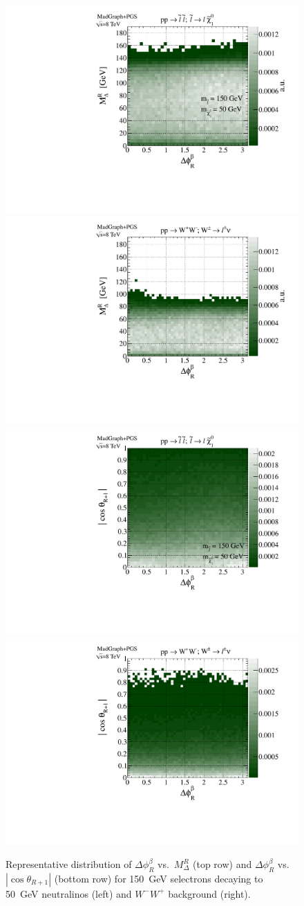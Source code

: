 \begin{figure}[ht]
\includegraphics[width=0.35\columnwidth]{fig/sectionII/Mdelta_v_dphi_slepton_150_50.pdf}\includegraphics[width=0.35\columnwidth]{fig/sectionII/Mdelta_v_dphi_WW.pdf}
\includegraphics[width=0.35\columnwidth]{fig/sectionII/costheta_v_dphi_selectron_150_50.pdf}\includegraphics[width=0.35\columnwidth]{fig/sectionII/costheta_v_dphi_WW.pdf}
\caption{Representative distribution of $\Delta\phi_R^\beta$ vs.~$M_\Delta^R$ (top row) and $\Delta\phi_R^\beta$ vs.~$|\cos\theta_{R+1}|$ (bottom row) 
 for 150~GeV selectrons decaying to 50~GeV neutralinos (left) and $W^-W^+$ background (right).  \label{fig:deltaphiMdelta}}
\end{figure}
